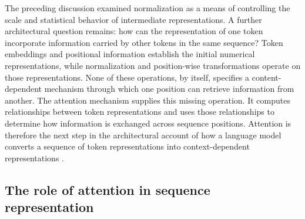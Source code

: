 
The preceding discussion examined normalization as a means of controlling the
scale and statistical behavior of intermediate representations. A further
architectural question remains: how can the representation of one token
incorporate information carried by other tokens in the same sequence? Token
embeddings and positional information establish the initial numerical
representations, while normalization and position-wise transformations operate
on those representations. None of these operations, by itself, specifies a
content-dependent mechanism through which one position can retrieve
information from another. The attention mechanism supplies this missing
operation. It computes relationships between token representations and uses
those relationships to determine how information is exchanged across sequence
positions. Attention is therefore the next step in the architectural account
of how a language model converts a sequence of token representations into
context-dependent representations
\parencite{ansar2024transformers,dao2023flashattention2}.

\subsection{The role of attention in sequence representation}
\label{subsec:attn-role-sequence-representation}


